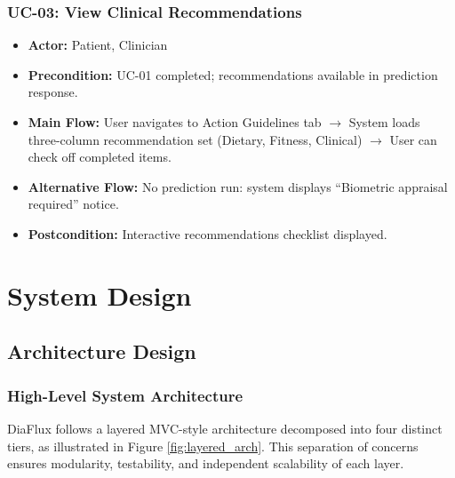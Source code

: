 \documentclass[12pt,a4paper]{report}
\begin{document}
\subsection*{UC-03: View Clinical Recommendations}
\begin{itemize}
    \item \textbf{Actor:} Patient, Clinician
    \item \textbf{Precondition:} UC-01 completed; recommendations available in prediction response.
    \item \textbf{Main Flow:} User navigates to Action Guidelines tab $\rightarrow$ System loads three-column recommendation set (Dietary, Fitness, Clinical) $\rightarrow$ User can check off completed items.
    \item \textbf{Alternative Flow:} No prediction run: system displays ``Biometric appraisal required'' notice.
    \item \textbf{Postcondition:} Interactive recommendations checklist displayed.
\end{itemize}

\clearpage

\chapter{System Design}

\section{Architecture Design}

\subsection{High-Level System Architecture}
DiaFlux follows a layered MVC-style architecture decomposed into four distinct tiers, as illustrated in Figure \ref{fig:layered_arch}. This separation of concerns ensures modularity, testability, and independent scalability of each layer.
\end{document}
